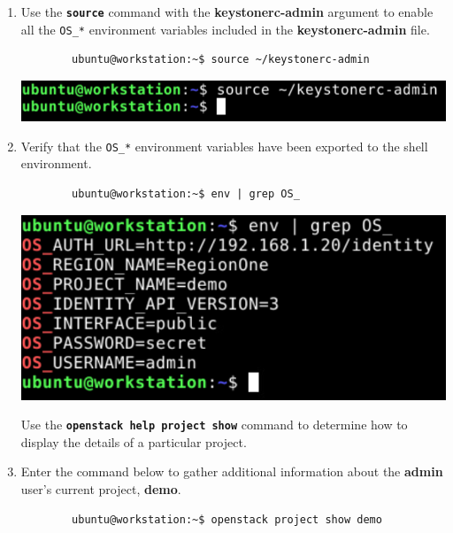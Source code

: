 \documentclass[letterpaper, 12pt]{article}
\begin{document}
\begin{enumerate}
    \item Use the \textbf{\texttt{source}} command with the \textbf{keystonerc-admin} argument to enable all the
    \texttt{OS\_*} environment variables included in the \textbf{keystonerc-admin} file.
    \begin{lstlisting}
        ubuntu@workstation:~$ source ~/keystonerc-admin
    \end{lstlisting}

    \begin{center}
        \includegraphics[width=\linewidth]{images/part2/step3.png}
    \end{center}

    \item Verify that the \texttt{OS\_*} environment variables have been exported to the shell environment.
    \begin{lstlisting}
        ubuntu@workstation:~$ env | grep OS_
    \end{lstlisting}

    \begin{center}
        \includegraphics[width=\linewidth]{images/part2/step4.png}
    \end{center}

    \begin{tipbox}
        Use the \textbf{\texttt{openstack help project show}} command to determine how to display the details of a
        particular project.
    \end{tipbox}

    \item Enter the command below to gather additional information about the \textbf{admin} user's current project,
    \textbf{demo}.
    \begin{lstlisting}
        ubuntu@workstation:~$ openstack project show demo
    \end{lstlisting}


\end{enumerate}
\end{document}

